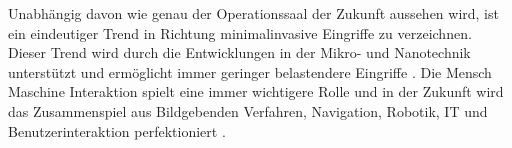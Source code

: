 Unabhängig davon wie genau der Operationssaal der Zukunft aussehen wird, ist ein eindeutiger Trend in Richtung minimalinvasive Eingriffe zu verzeichnen. Dieser Trend wird durch die Entwicklungen in der Mikro- und Nanotechnik unterstützt und ermöglicht immer geringer belastendere Eingriffe \cite{DerDigitaleOperationssaal}.
Die Mensch Maschine Interaktion spielt eine immer wichtigere Rolle und in der Zukunft wird das Zusammenspiel aus Bildgebenden Verfahren, Navigation, Robotik, IT und Benutzerinteraktion perfektioniert \cite{CurrentAndFuture}.



	
	



